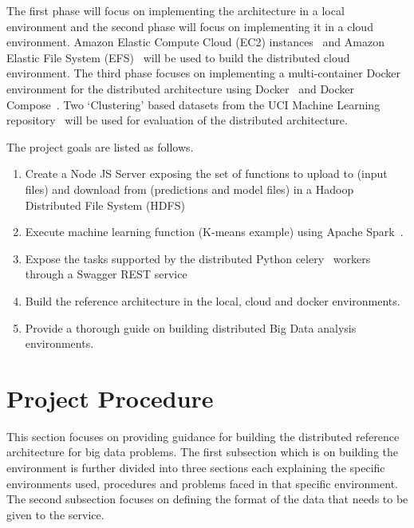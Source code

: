 The first phase will focus on implementing the architecture in a local 
environment and the second phase will focus on implementing it in a cloud 
environment. Amazon Elastic Compute Cloud (EC2) 
instances~\cite{hid-sp18-416-www-amazon-ec2} and 
Amazon Elastic File System (EFS)~\cite{hid-sp18-416-www-amazon-efs} will be 
used to build the distributed cloud environment. The third 
phase focuses on implementing a multi-container Docker environment for the 
distributed architecture using Docker~\cite{hid-sp18-416-www-docker} and 
Docker Compose~\cite{hid-sp18-416-www-docker-compose}. Two `Clustering' based 
datasets from the UCI Machine Learning 
repository~\cite{hid-sp18-416-www-uci-ml-repository} will be used for 
evaluation of the distributed architecture. 

The project goals are listed as follows.
\begin{enumerate}
	\item Create a Node JS Server exposing the set of functions to upload 
	to (input files) and download from (predictions and model files) in a 
	Hadoop Distributed File System (HDFS)~\cite{hid-sp18-416-www-ibm-hdfs}
	\item Execute machine learning function (K-means example) using Apache 
	Spark~\cite{hid-sp18-416-www-apache-spark}.
	\item Expose the tasks supported by the distributed Python 
	celery~\cite{hid-sp18-416-www-python-celery} workers through a Swagger REST 
	service~\cite{hid-sp18-416-www-swagger}
	\item Build the reference architecture in the local, cloud and docker 
	environments.
	\item Provide a thorough guide on building distributed Big Data analysis 
	environments.	
\end{enumerate}

\section{Project Procedure}

This section focuses on providing guidance for building the distributed 
reference architecture for big data problems. The first subsection which is on 
building the environment is further divided into three sections each 
explaining the specific environments used, procedures and problems faced in 
that specific environment. The second subsection focuses on defining the 
format of the data that needs to be given to the service.   

